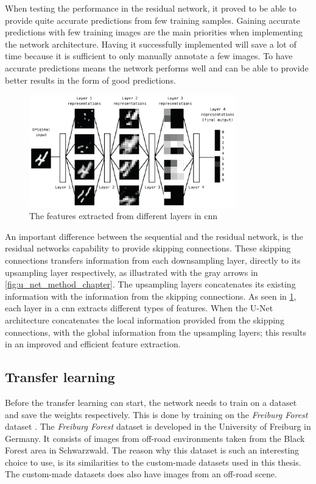 \documentclass[USenglish]{ifimaster}  %
\begin{document}
When testing the performance in the residual network, it proved to be able to provide quite accurate predictions from few training samples. Gaining accurate predictions with few training images are the main priorities when implementing the network architecture. Having it successfully implemented will save a lot of time because it is sufficient to only manually annotate a few images. To have accurate predictions means the network performs well and can be able to provide better results in the form of good predictions. 

\begin{figure}[ht]
    \centering
    \includegraphics[width=0.8\textwidth]{bilder/layers_features.png}
    \caption{The features extracted from different layers in \ac{cnn} \cite{Francois_Deep_learning_with_python}}
    \label{fig:layers_features}
\end{figure}

An important difference between the sequential and the residual network, is the residual networks capability to provide skipping connections. These skipping connections transfers information from each downsampling layer, directly to its upsampling layer respectively, as illustrated with the gray arrows in \cref{fig:u_net_method_chapter}. The upsampling layers concatenates its existing information with the information from the skipping connections. As seen in \cref{fig:layers_features}, each layer in a \ac{cnn} extracts different types of features. When the U-Net architecture concatenates the local information provided from the skipping connections, with the global information from the upsampling layers; this results in an improved and efficient feature extraction.  

\subsection{Transfer learning}\label{transfer_learning}
Before the transfer learning can start, the network needs to train on a dataset and save the weights respectively. This is done by training on the \textit{Freiburg Forest} dataset \cite{freiburg_dataset_valada16iser}. The \textit{Freiburg Forest} dataset is developed in the University of Freiburg in Germany. It consists of images from off-road environments taken from the Black Forest area in Schwarzwald. The reason why this dataset is such an interesting choice to use, is its similarities to the custom-made datasets used in this thesis. The custom-made datasets does also have images from an off-road scene.
\end{document}
